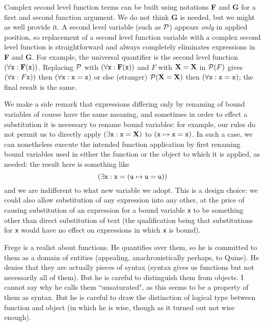 \documentclass[12pt]{article}
\begin{document}
Complex second level function terms can be built using notations {\bf F} and {\bf G} for a first and second function argument.  We do not think {\bf G} is needed, but we might as well provide it.  A second level variable (such as $\cal P$)  appears {\em only\/} in applied position, so replacement of a second level function variable with a complex second level function is straightforward and always completely eliminates expressions in {\bf F} and {\bf G}.  For example, the universal quantifier is the second level function $(\forall {\tt x}:{\bf F}({\tt x}))$.  Replacing $\cal P$ with $(\forall {\tt x}:{\bf F}({\tt x}))$ and $F$ with ${\bf X}={\bf X}$ in ${\cal P}(F)$ gives
$(\forall {\tt x}:{ F}{\tt x}))$ then $(\forall {\tt x}:{\tt x}={\tt x})$ or else (stranger)  ${\cal P}({\bf X} = {\bf X})$ then $(\forall {\tt x}:{\tt x}={\tt x})$;  the final result is the same.

We make a side remark that expressions differing only by renaming of bound variables of course have the same meaning, and sometimes in order to effect a substitution it is necessary to rename bound variables:
for example, our rules do not permit us to directly apply $(\exists {\tt x}:{\tt x} = {\bf X})$ to $({\tt x} \mapsto {\tt x} = {\tt x})$.  In such a case, we can nonetheless execute the intended function application by
first renaming bound variables used in either the function or the object to which it is applied, as needed:  the result here is something like  $$(\exists {\tt x}:{\tt x} =({\tt u} \mapsto {\tt u} = {\tt u}))$$ and we are indifferent to what new variable we adopt.  This is a design choice: we could also allow substitution of any expression into any other, at the price of causing substitution of an expression for a bound variable {\tt x} to be something other than direct substitution of text (the qualification being that substitutions for {\tt x} would have no effect on expressions in which {\tt x} is bound).

Frege is a realist about functions.  He quantifies over them, so he is committed to them as a domain of entities  (appealing, anachronistically perhaps, to Quine).  He denies that they are actually pieces of syntax (syntax gives us functions but not necessarily all of them).  But he is careful to distinguish them from objects.  I cannot say why he calls them ``unsaturated", as this seems to be a property of them as syntax.  But he is careful to draw the distinction of logical type between function and object (in which he is wise, though as it turned out not wise enough).
\end{document}
